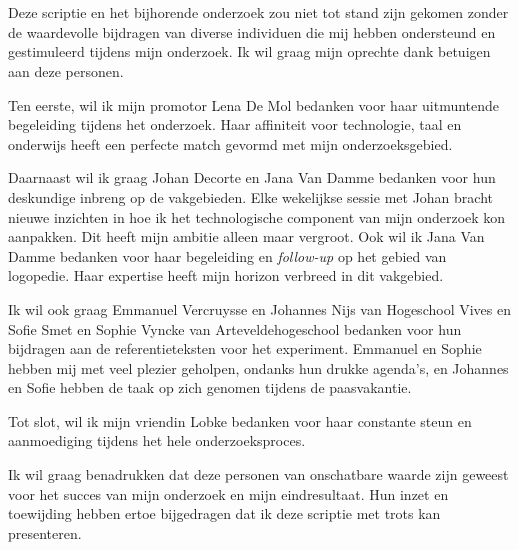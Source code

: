 
\chapter*{}%
\label{ch:voorwoord}


\lipsum[1-2]


Deze scriptie en het bijhorende onderzoek zou niet tot stand zijn gekomen zonder de waardevolle bijdragen van diverse individuen die mij hebben ondersteund en gestimuleerd tijdens mijn onderzoek. Ik wil graag mijn oprechte dank betuigen aan deze personen.

Ten eerste, wil ik mijn promotor Lena De Mol bedanken voor haar uitmuntende begeleiding tijdens het onderzoek. Haar affiniteit voor technologie, taal en onderwijs heeft een perfecte match gevormd met mijn onderzoeksgebied.

Daarnaast wil ik graag Johan Decorte en Jana Van Damme bedanken voor hun deskundige inbreng op de vakgebieden. Elke wekelijkse sessie met Johan bracht nieuwe inzichten in hoe ik het technologische component van mijn onderzoek kon aanpakken. Dit heeft mijn ambitie alleen maar vergroot. Ook wil ik Jana Van Damme bedanken voor haar begeleiding en \textit{follow-up} op het gebied van logopedie. Haar expertise heeft mijn horizon verbreed in dit vakgebied.

Ik wil ook graag Emmanuel Vercruysse en Johannes Nijs van Hogeschool Vives en Sofie Smet en Sophie Vyncke van Arteveldehogeschool bedanken voor hun bijdragen aan de referentieteksten voor het experiment. Emmanuel en Sophie hebben mij met veel plezier geholpen, ondanks hun drukke agenda's, en Johannes en Sofie hebben de taak op zich genomen tijdens de paasvakantie.

Tot slot, wil ik mijn vriendin Lobke bedanken voor haar constante steun en aanmoediging tijdens het hele onderzoeksproces.

Ik wil graag benadrukken dat deze personen van onschatbare waarde zijn geweest voor het succes van mijn onderzoek en mijn eindresultaat. Hun inzet en toewijding hebben ertoe bijgedragen dat ik deze scriptie met trots kan presenteren.